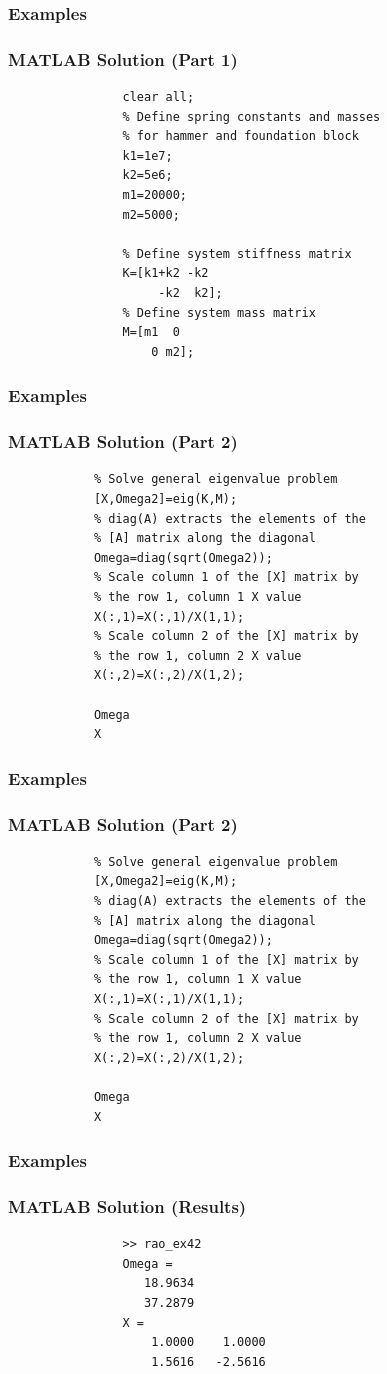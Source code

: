 \documentclass[fleqn]{ltx-talk} %
\newcommand{\sectionIIsubsectionVtitle}{Examples}
\begin{document}
			\begin{frame*}
				\frametitle{\sectionIIsubsectionVtitle}
				\bigskip

				  \frametitle{MATLAB Solution (Part 1)}

				  \begin{verbatim}
				clear all;
				% Define spring constants and masses
				% for hammer and foundation block
				k1=1e7;
				k2=5e6;
				m1=20000;
				m2=5000;

				% Define system stiffness matrix
				K=[k1+k2 -k2
				     -k2  k2];
				% Define system mass matrix
				M=[m1  0
				    0 m2];
				  \end{verbatim}


				\btVFill 
			\end{frame*}



			\begin{frame*}
				\frametitle{\sectionIIsubsectionVtitle}
				\bigskip

				  \frametitle{MATLAB Solution (Part 2)}

			  \begin{verbatim}
			% Solve general eigenvalue problem
			[X,Omega2]=eig(K,M);
			% diag(A) extracts the elements of the
			% [A] matrix along the diagonal
			Omega=diag(sqrt(Omega2));
			% Scale column 1 of the [X] matrix by
			% the row 1, column 1 X value
			X(:,1)=X(:,1)/X(1,1);
			% Scale column 2 of the [X] matrix by
			% the row 1, column 2 X value
			X(:,2)=X(:,2)/X(1,2);

			Omega
			X
			  \end{verbatim}


				\btVFill 
			\end{frame*}


			\begin{frame*}
				\frametitle{\sectionIIsubsectionVtitle}
				\bigskip

				  \frametitle{MATLAB Solution (Part 2)}

			  \begin{verbatim}
			% Solve general eigenvalue problem
			[X,Omega2]=eig(K,M);
			% diag(A) extracts the elements of the
			% [A] matrix along the diagonal
			Omega=diag(sqrt(Omega2));
			% Scale column 1 of the [X] matrix by
			% the row 1, column 1 X value
			X(:,1)=X(:,1)/X(1,1);
			% Scale column 2 of the [X] matrix by
			% the row 1, column 2 X value
			X(:,2)=X(:,2)/X(1,2);

			Omega
			X
			  \end{verbatim}

				\btVFill 
			\end{frame*}


			\begin{frame*}
				\frametitle{\sectionIIsubsectionVtitle}
				\bigskip

				  \frametitle{MATLAB Solution (Results)}

				  \begin{verbatim}
				>> rao_ex42
				Omega =
				   18.9634
				   37.2879
				X =
				    1.0000    1.0000
				    1.5616   -2.5616
				  \end{verbatim}

				\btVFill 
			\end{frame*}
\end{document}
